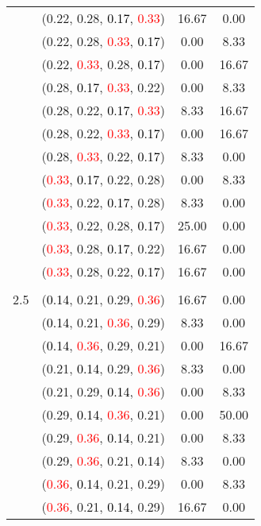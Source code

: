 \documentclass[10pt,a4paper]{report}
\begin{document}
\begin{center}
\begin{longtable}{clcc}
			&(0.22, 0.28, \textcolor{black}{0.17}, \textcolor{red}{0.33})&16.67&0.00\\
			&(0.22, 0.28, \textcolor{red}{0.33}, \textcolor{black}{0.17})&0.00&8.33\\
			&(0.22, \textcolor{red}{0.33}, 0.28, \textcolor{black}{0.17})&0.00&16.67\\
			&(0.28, \textcolor{black}{0.17}, \textcolor{red}{0.33}, 0.22)&0.00&8.33\\
			&(0.28, 0.22, \textcolor{black}{0.17}, \textcolor{red}{0.33})&8.33&16.67\\
			&(0.28, 0.22, \textcolor{red}{0.33}, \textcolor{black}{0.17})&0.00&16.67\\
			&(0.28, \textcolor{red}{0.33}, 0.22, \textcolor{black}{0.17})&8.33&0.00\\
			&(\textcolor{red}{0.33}, \textcolor{black}{0.17}, 0.22, 0.28)&0.00&8.33\\
			&(\textcolor{red}{0.33}, 0.22, \textcolor{black}{0.17}, 0.28)&8.33&0.00\\
			&(\textcolor{red}{0.33}, 0.22, 0.28, \textcolor{black}{0.17})&25.00&0.00\\
			&(\textcolor{red}{0.33}, 0.28, \textcolor{black}{0.17}, 0.22)&16.67&0.00\\
			&(\textcolor{red}{0.33}, 0.28, 0.22, \textcolor{black}{0.17})&16.67&0.00\\
		&&&\\
		2.5			&(\textcolor{black}{0.14}, 0.21, 0.29, \textcolor{red}{0.36})&16.67&0.00\\
			&(\textcolor{black}{0.14}, 0.21, \textcolor{red}{0.36}, 0.29)&8.33&0.00\\
			&(\textcolor{black}{0.14}, \textcolor{red}{0.36}, 0.29, 0.21)&0.00&16.67\\
			&(0.21, \textcolor{black}{0.14}, 0.29, \textcolor{red}{0.36})&8.33&0.00\\
			&(0.21, 0.29, \textcolor{black}{0.14}, \textcolor{red}{0.36})&0.00&8.33\\
			&(0.29, \textcolor{black}{0.14}, \textcolor{red}{0.36}, 0.21)&0.00&50.00\\
			&(0.29, \textcolor{red}{0.36}, \textcolor{black}{0.14}, 0.21)&0.00&8.33\\
			&(0.29, \textcolor{red}{0.36}, 0.21, \textcolor{black}{0.14})&8.33&0.00\\
			&(\textcolor{red}{0.36}, \textcolor{black}{0.14}, 0.21, 0.29)&0.00&8.33\\
			&(\textcolor{red}{0.36}, 0.21, \textcolor{black}{0.14}, 0.29)&16.67&0.00\\

\end{longtable}
\end{center}
\end{document}

